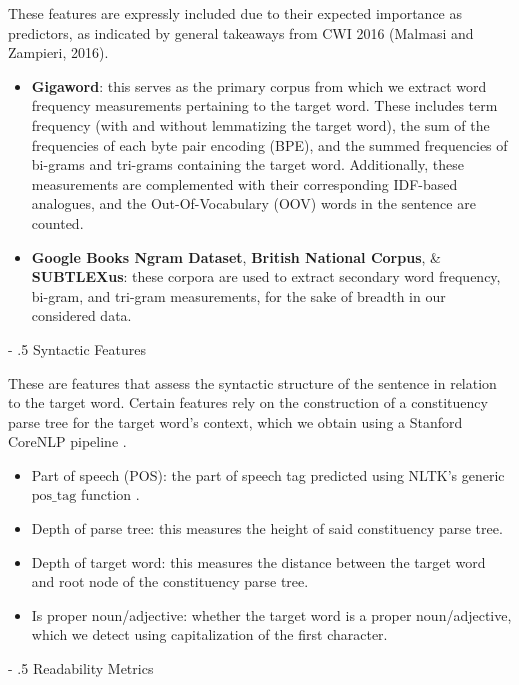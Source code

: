 \documentclass[11pt,a4paper]{article}
\makeatletter
\renewcommand\paragraph{%
    \@startsection{paragraph}{4}{0mm}%
        {-\baselineskip}%
        {.5\baselineskip}%
        {\normalfont\normalsize\bfseries}}
\makeatother
\begin{document}
These features are expressly included due to their expected  importance as predictors, as indicated by general takeaways from CWI 2016 (Malmasi and Zampieri, 2016). 

\begin{itemize}
  \item \textbf{Gigaword}: this serves as the primary corpus from which we extract word frequency measurements pertaining to the target word. These includes term frequency (with and without lemmatizing the target word), the sum of the frequencies of each byte pair encoding (BPE), and the summed frequencies of bi-grams and tri-grams containing the target word. Additionally, these measurements are complemented with their corresponding IDF-based analogues, and the Out-Of-Vocabulary (OOV) words in the sentence are counted.
  \item \textbf{Google Books Ngram Dataset}, \textbf{British National Corpus}, \& \textbf{SUBTLEXus}: these corpora are used to extract secondary word frequency, bi-gram, and tri-gram measurements, for the sake of breadth in our considered data.
\end{itemize}

\paragraph{Syntactic Features}

These are features that assess the syntactic structure of the sentence in relation to the target word. Certain features rely on the construction of a constituency parse tree for the target word's context, which we obtain using a Stanford CoreNLP pipeline \citep{manning-EtAl:2014:P14-5}.

\begin{itemize}
  \item Part of speech (POS): the part of speech tag predicted using NLTK's generic $\text{pos\_tag}$ function \citep{Loper02nltk:the}.
  \item Depth of parse tree: this measures the height of said constituency parse tree.
  \item Depth of target word: this measures the distance between the target word and root node of the constituency parse tree.
  \item Is proper noun/adjective: whether the target word is a proper noun/adjective, which we detect using capitalization of the first character.
\end{itemize}

\paragraph{Readability Metrics}
\end{document}
